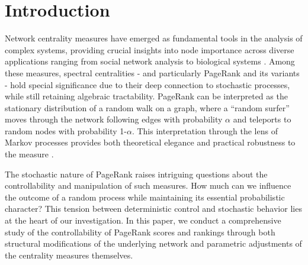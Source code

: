 \documentclass[sn-mathphys-ay]{sn-jnl}%
\theoremstyle{thmstyleone}%
\theoremstyle{thmstyletwo}%
\theoremstyle{thmstylethree}%
\begin{document}
	
	
	
	\maketitle
	
	
	
	
	


\section{Introduction}\label{sec:introduction}

Network centrality measures have emerged as fundamental tools in the analysis of complex systems, providing crucial insights into node importance across diverse applications ranging from social network analysis to biological systems \cite{boccaletti2006complex, newman2010networks}. Among these measures, spectral centralities \cite{vigna2016spectral}- and particularly PageRank \cite{page1998pagerank} and its variants - hold special significance due to their deep connection to stochastic processes, while still retaining algebraic tractability. PageRank can be interpreted as the stationary distribution of a random walk on a graph, where a ``random surfer'' moves through the network following edges with probability $\alpha$ and teleports to random nodes with probability 1-$\alpha$. This interpretation through the lens of Markov processes provides both theoretical elegance and practical robustness to the measure \cite{langville2006google}.

The stochastic nature of PageRank raises intriguing questions about the controllability and manipulation of such measures. How much can we influence the outcome of a random process while maintaining its essential probabilistic character? This tension between deterministic control and stochastic behavior lies at the heart of our investigation. In this paper, we conduct a comprehensive study of the controllability of PageRank scores and rankings through both structural modifications of the underlying network and parametric adjustments of the centrality measures themselves.
\end{document}

